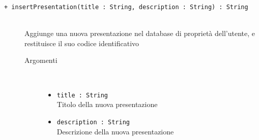\begin{description}
	\begin{description}
		\item[\texttt{+ insertPresentation(title : String, description : String) : String			}] \hfill \\
			Aggiunge una nuova presentazione nel database di proprietà dell'utente, e restituisce il suo codice identificativo
			
		\begin{description}
			\item[Argomenti] \hfill \\
				\begin{itemize}
				
					\item \texttt{title : String			} \hfill \\
					Titolo della nuova presentazione
					\item \texttt{description : String			} \hfill \\
					Descrizione della nuova presentazione
					

\end{itemize}
\end{description}
\end{description}
\end{description}
